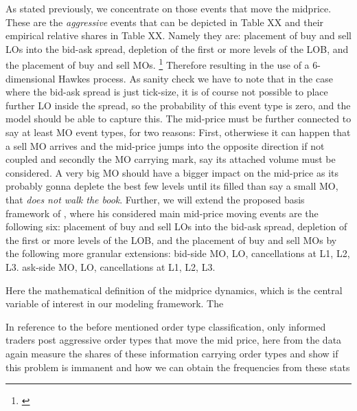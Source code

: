 \documentclass[12pt,a4paper]{cau_thesis}
\begin{document}
As stated previously, we concentrate on those events that move the
midprice. These are the \emph{aggressive} events that can be depicted
in Table XX and their empirical relative shares in Table XX. Namely
they are: placement of buy and sell LOs into the bid-ask spread,
depletion of the first or more levels of the LOB, and the placement
of buy and sell MOs. \footnote{\cite[See ][,
        p.80]{luckner2021hawkes}} Therefore resulting in the use of a
6-dimensional Hawkes process. As sanity check we have to note that in
the case where the bid-ask spread is just tick-size, it is of course
not possible to place further LO inside the spread, so the
probability of this event type is zero, and the model should be able
to capture this. The mid-price must be further connected to say at
least MO event types, for two reasons: First, otherwiese it can
happen that a sell MO arrives and the mid-price jumps into the
opposite direction if not coupled and secondly the MO carrying mark,
say its attached volume must be considered. A very big MO should have
a bigger impact on the mid-price as its probably gonna deplete the
best few levels until its filled than say a small MO, that
\textit{does not walk the book}. Further, we will extend the proposed
basis framework of \cite{luckner2021hawkes}, where his considered
main mid-price moving events are the following six: placement of buy
and sell LOs into the bid-ask spread, depletion of the first or more
levels of the LOB, and the placement of buy and sell MOs by the
following more granular extensions: bid-side MO, LO, cancellations at
L1, L2, L3. ask-side MO, LO, cancellations at L1, L2, L3.

Here the mathematical definition of the midprice dynamics, which is
the central variable of interest in our modeling framework. The

In reference to the before mentioned order type classification, only
informed traders post aggressive order types that move the mid price,
here from the data again measure the shares of these information
carrying order types and show if this problem is immanent and how we
can obtain the frequencies from these stats
\end{document}
